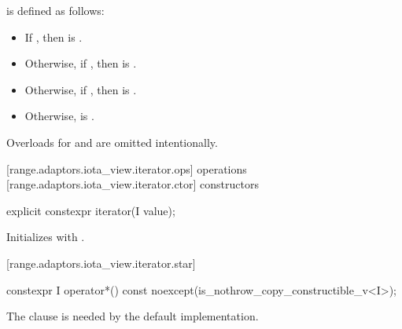 \pnum
{} is defined as follows:
\begin{itemize}
\item If    , then
 is .
\item Otherwise, if    , then
 is .
\item Otherwise, if    , then
 is .
\item Otherwise,  is .
\end{itemize}

\pnum
\begin{note}
Overloads for  and  are omitted
intentionally.
\end{note}

[range.adaptors.iota_view.iterator.ops]{ operations}
[range.adaptors.iota_view.iterator.ctor]{ constructors}

\begin{itemdecl}
explicit constexpr iterator(I value);
\end{itemdecl}

\begin{itemdescr}
\pnum
\effects Initializes  with .
\end{itemdescr}

[range.adaptors.iota_view.iterator.star]{}

\begin{itemdecl}
constexpr I operator*() const noexcept(is_nothrow_copy_constructible_v<I>);
\end{itemdecl}

\begin{itemdescr}
\pnum
\oldtxt{\returns} 

\pnum
\begin{note}
The  clause is needed by the default 
implementation.
\end{note}
\end{itemdescr}

